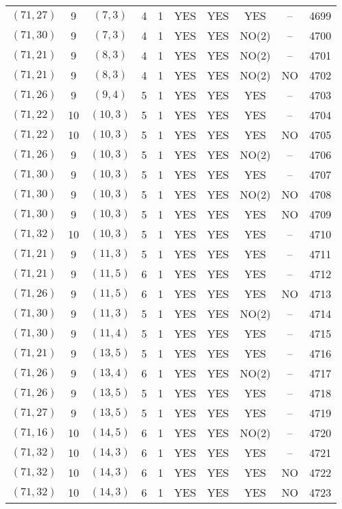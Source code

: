 \begin{longtable}{|c|c|c|c|c|c|c|c|c|c|}
$(71, 27)$ & 9 & $(7, 3)$ & 4 & 1 & YES & YES & YES & -- & 4699\\
$(71, 30)$ & 9 & $(7, 3)$ & 4 & 1 & YES & YES & NO(2) & -- & 4700\\
$(71, 21)$ & 9 & $(8, 3)$ & 4 & 1 & YES & YES & NO(2) & -- & 4701\\
$(71, 21)$ & 9 & $(8, 3)$ & 4 & 1 & YES & YES & NO(2) & NO & 4702\\
$(71, 26)$ & 9 & $(9, 4)$ & 5 & 1 & YES & YES & YES & -- & 4703\\
$(71, 22)$ & 10 & $(10, 3)$ & 5 & 1 & YES & YES & YES & -- & 4704\\
$(71, 22)$ & 10 & $(10, 3)$ & 5 & 1 & YES & YES & YES & NO & 4705\\
$(71, 26)$ & 9 & $(10, 3)$ & 5 & 1 & YES & YES & NO(2) & -- & 4706\\
$(71, 30)$ & 9 & $(10, 3)$ & 5 & 1 & YES & YES & YES & -- & 4707\\
$(71, 30)$ & 9 & $(10, 3)$ & 5 & 1 & YES & YES & NO(2) & NO & 4708\\
$(71, 30)$ & 9 & $(10, 3)$ & 5 & 1 & YES & YES & YES & NO & 4709\\
$(71, 32)$ & 10 & $(10, 3)$ & 5 & 1 & YES & YES & YES & -- & 4710\\
$(71, 21)$ & 9 & $(11, 3)$ & 5 & 1 & YES & YES & YES & -- & 4711\\
$(71, 21)$ & 9 & $(11, 5)$ & 6 & 1 & YES & YES & YES & -- & 4712\\
$(71, 26)$ & 9 & $(11, 5)$ & 6 & 1 & YES & YES & YES & NO & 4713\\
$(71, 30)$ & 9 & $(11, 3)$ & 5 & 1 & YES & YES & NO(2) & -- & 4714\\
$(71, 30)$ & 9 & $(11, 4)$ & 5 & 1 & YES & YES & YES & -- & 4715\\
$(71, 21)$ & 9 & $(13, 5)$ & 5 & 1 & YES & YES & YES & -- & 4716\\
$(71, 26)$ & 9 & $(13, 4)$ & 6 & 1 & YES & YES & NO(2) & -- & 4717\\
$(71, 26)$ & 9 & $(13, 5)$ & 5 & 1 & YES & YES & YES & -- & 4718\\
$(71, 27)$ & 9 & $(13, 5)$ & 5 & 1 & YES & YES & YES & -- & 4719\\
$(71, 16)$ & 10 & $(14, 5)$ & 6 & 1 & YES & YES & NO(2) & -- & 4720\\
$(71, 32)$ & 10 & $(14, 3)$ & 6 & 1 & YES & YES & YES & -- & 4721\\
$(71, 32)$ & 10 & $(14, 3)$ & 6 & 1 & YES & YES & YES & NO & 4722\\
$(71, 32)$ & 10 & $(14, 3)$ & 6 & 1 & YES & YES & YES & NO & 4723\\

\end{longtable}

